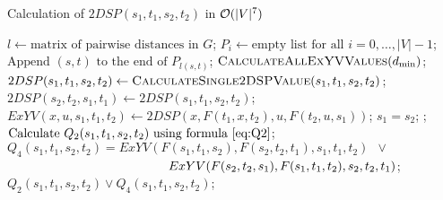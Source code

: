 \begin{algorithm}
\caption{Calculation of $2DSP(s_1, t_1, s_2, t_2)$ in $\mathcal{O}(|V|^7)$} \label{alg:n7}
\begin{algorithmic}[1]
\State $l \gets \text{matrix of pairwise distances in }G$;
\State $P_i \gets \text{empty list for all }i = 0, \ldots, |V|-1$;
    \State $\text{Append }(s, t)\text{ to the end of }P_{l(s, t)}$;
\EndFor
{}
    \State $\textsc{CalculateAllExYVValues}(d_{\min})$; \label{line:calcExYV}
                \State $2DSP(s_1, t_1, s_2, t_2) \gets \textsc{CalculateSingle2DSPValue}(s_1, t_1, s_2, t_2)$;
                \State $2DSP(s_2, t_2, s_1, t_1) \gets 2DSP(s_1, t_1, s_2, t_2)$; 
            \EndFor
        \EndFor
    \EndFor
\EndFor
\EndProcedure
\Statex
{}
                \State $ExYV(x,u,s_1,t_1,t_2) \gets 2DSP(x, F(t_1,x,t_2), u, F(t_2,u,s_1))$;
            \EndFor
        \EndFor
    \EndFor
\EndProcedure
\Statex
{}
    \State \Return $s_1 = s_2$; 
    \State {};
\Else
    \State $\text{Calculate }Q_2(s_1, t_1, s_2, t_2)\text{ using formula \eqref{eq:Q2}}$; 
    \State $Q_4(s_1, t_1, s_2, t_2) = ExYV(F(s_1, t_1, s_2), F(s_2, t_2, t_1), s_1, t_1, t_2)\enspace\vee\enspace$ 
    \Statex $\hspace{4.5cm}ExYV(F(s_2, t_2, s_1), F(s_1, t_1, t_2), s_2, t_2, t_1)$; \label{line:useExYV}
    \State \Return $Q_2(s_1, t_1, s_2, t_2) \vee Q_4(s_1, t_1, s_2, t_2)$;
\EndIf
\EndProcedure
\end{algorithmic}
\end{algorithm}


